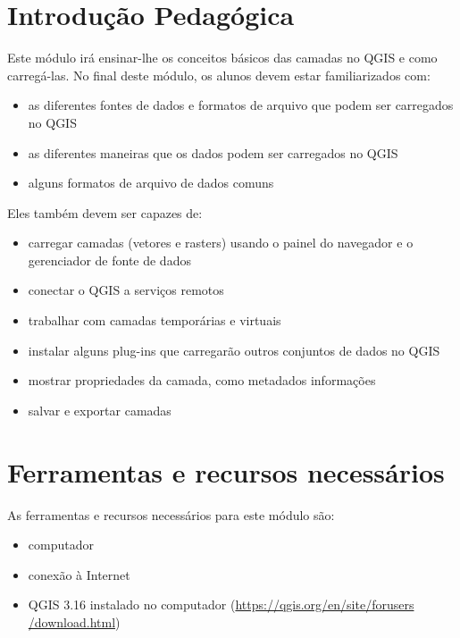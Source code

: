 \documentclass[
]{book}
\providecommand{\tightlist}{%
  \setlength{\itemsep}{0pt}\setlength{\parskip}{0pt}}
\begin{document}
\hypertarget{introduuxe7uxe3o-pedaguxf3gica-2}{%
\section{Introdução Pedagógica}\label{introduuxe7uxe3o-pedaguxf3gica-2}}

Este módulo irá ensinar-lhe os conceitos básicos das camadas no QGIS e como carregá-las. No final deste módulo, os alunos devem estar familiarizados com:

\begin{itemize}
\tightlist
\item
  as diferentes fontes de dados e formatos de arquivo que podem ser carregados no QGIS
\item
  as diferentes maneiras que os dados podem ser carregados no QGIS
\item
  alguns formatos de arquivo de dados comuns
\end{itemize}

Eles também devem ser capazes de:

\begin{itemize}
\tightlist
\item
  carregar camadas (vetores e rasters) usando o painel do navegador e o gerenciador de fonte de dados
\item
  conectar o QGIS a serviços remotos
\item
  trabalhar com camadas temporárias e virtuais
\item
  instalar alguns plug-ins que carregarão outros conjuntos de dados no QGIS
\item
  mostrar propriedades da camada, como metadados informações
\item
  salvar e exportar camadas
\end{itemize}

\hypertarget{ferramentas-e-recursos-necessuxe1rios-2}{%
\section{Ferramentas e recursos necessários}\label{ferramentas-e-recursos-necessuxe1rios-2}}

As ferramentas e recursos necessários para este módulo são:

\begin{itemize}
\tightlist
\item
  computador
\item
  conexão à Internet
\item
  QGIS 3.16 instalado no computador (\href{https://qgis.org/en/site/forusers/download.html}{https://qgis.org/en/site/forusers /download.html})
\end{itemize}
\end{document}
